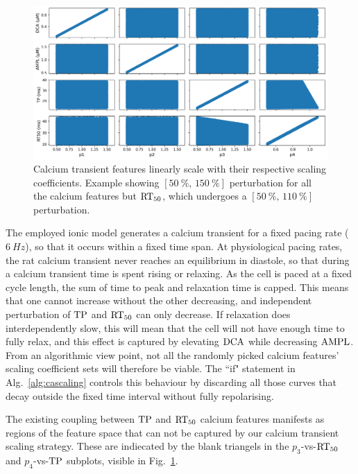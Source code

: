 \begin{figure}[!ht]
    \myfloatalign
    \includegraphics[width=\textwidth]{figures/chapter06/p_vs_b.png}
    \caption{Calcium transient features linearly scale with their respective scaling coefficients. Example showing $[\SI{50}{\percent},\,\SI{150}{\percent}]$ perturbation for all the calcium features but $\textrm{RT}_{50}$, which undergoes a $[\SI{50}{\percent},\,\SI{110}{\percent}]$ perturbation.}
    \label{fig:scalersvscafeatures}
\end{figure}

\vspace{0.2cm}
The employed ionic model generates a calcium transient for a fixed pacing rate ($\SI{6}{Hz}$), so that it occurs within a fixed time span. At physiological pacing rates, the rat calcium transient never reaches an equilibrium in diastole, so that during a calcium transient time is spent rising or relaxing. As the cell is paced at a fixed cycle length, the sum of time to peak and relaxation time is capped. This means that one cannot increase without the other decreasing, and independent perturbation of $\textrm{TP}$ and $\textrm{RT}_{50}$ can only decrease. If relaxation does interdependently slow, this will mean that the cell will not have enough time to fully relax, and this effect is captured by elevating $\textrm{DCA}$ while decreasing $\textrm{AMPL}$. From an algorithmic view point, not all the randomly picked calcium features' scaling coefficient sets will therefore be viable. The ``if" statement in Alg.~\ref{alg:cascaling} controls this behaviour by discarding all those curves that decay outside the fixed time interval without fully repolarising.

\vspace{0.2cm}
The existing coupling between $\textrm{TP}$ and $\textrm{RT}_{50}$ calcium features manifests as regions of the feature space that can not be captured by our calcium transient scaling strategy. These are indiecated by the blank triangels in the $p_3$-vs-$\textrm{RT}_{50}$ and $p_4$-vs-$\textrm{TP}$ subplots, visible in Fig.~\ref{fig:scalersvscafeatures}.


